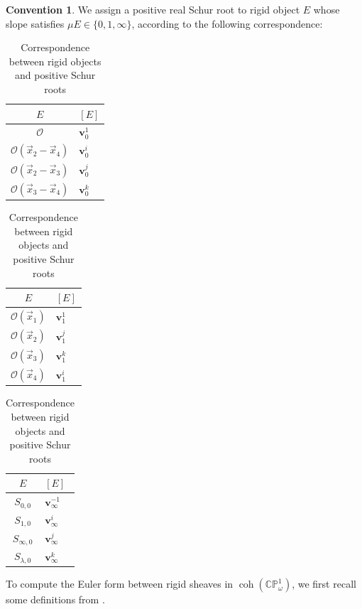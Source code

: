 \documentclass[11pt,a4paper,reqno]{amsart}%
\theoremstyle{plain}
\theoremstyle{definition}
\newtheorem{convention}[convention]{Convention}
\numberwithin{equation}{section}
\numberwithin{equation}{section}
\def\wt{\omega}
\def\coh{\operatorname{coh}}
\def\coh{\operatorname{coh}}
\def\CPone{\mathbb{CP}^1_{\wt}}
\begin{document}
\begin{convention}\label{convention:roots}
We assign a positive real Schur root to  rigid object $E$ whose slope satisfies $\mu E\in\{0,1,\infty\}$, according to the following correspondence:
\begin{table}[htbp]
  \centering
  \caption{Correspondence between rigid objects and positive   Schur roots}
  \label{tab:schur-roots}
   \renewcommand{\arraystretch}{1.2}
\setlength{\tabcolsep}{12pt}
  \begin{tabular}{cl} 
    \toprule
    $E$ & $[E]$ \\
    \midrule
    $\mathcal{O}$ & $\mathbf{v}_0^1$ \\
    $\mathcal{O}(\vec{x}_2 - \vec{x}_4)$ & $\mathbf{v}_0^i$ \\
    $\mathcal{O}(\vec{x}_2 - \vec{x}_3)$ & $\mathbf{v}_0^j$ \\
    $\mathcal{O}(\vec{x}_3 - \vec{x}_4)$ & $\mathbf{v}_0^k$ \\
    \bottomrule
  \end{tabular}
  \quad 
  \begin{tabular}{cl}
    \toprule
    $E$ & $[E]$ \\
    \midrule
    $\mathcal{O}(\vec{x}_1)$ & $\mathbf{v}_1^1$ \\
    $\mathcal{O}(\vec{x}_2)$ & $\mathbf{v}_1^j$ \\
    $\mathcal{O}(\vec{x}_3)$ & $\mathbf{v}_1^k$ \\
    $\mathcal{O}(\vec{x}_4)$ & $\mathbf{v}_1^i$ \\
    \bottomrule
  \end{tabular}
  \quad
  \begin{tabular}{cl}
    \toprule
    $E$ & $[E]$ \\
    \midrule
    $S_{0,0}$ & $\mathbf{v}_\infty^{-1}$ \\
    $S_{1,0}$ & $\mathbf{v}_\infty^i$ \\
    $S_{\infty,0}$ & $\mathbf{v}_\infty^j$ \\
    $S_{\lambda,0}$ & $\mathbf{v}_\infty^k$ \\
    \bottomrule
  \end{tabular}
  
\end{table}

\end{convention}
 

 
To compute the Euler form between rigid sheaves in $\coh(\CPone)$, we first recall some definitions from \cite{BG}.
\end{document}
